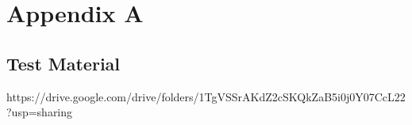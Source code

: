 \chapter{Appendix A}

\section{Test Material}\label{Ch:AppendixA}

https://drive.google.com/drive/folders/1TgVSSrAKdZ2cSKQkZaB5i0j0Y07CcL22?usp=sharing